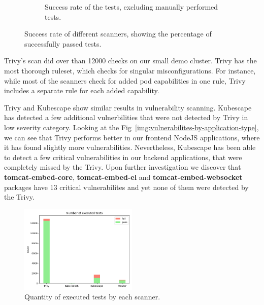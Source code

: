\begin{figure}[!h]
\begin{subfigure}{.4\textwidth}
        \caption{Success rate of the tests, excluding manually performed tests.}
        \label{img:success-rate-no-manual}
        \end{subfigure}
        \caption{Success rate of different scanners, showing the percentage of successfully passed tests.}
        \label{fig:success-rates}
\end{figure}

Trivy's scan did over than 12000 checks on our small demo cluster. Trivy has the most thorough ruleset, which checks for singular misconfigurations. For instance, while most of the scanners check for added pod capabilities in one rule, Trivy includes a separate rule for each added capability.

Trivy and Kubescape show similar results in vulnerability scanning. Kubescape has detected a few additional vulnerbilities that were not detected by Trivy in low severity category. Looking at the Fig~\ref{img:vulnerabilites-by-application-type}, we can see that Trivy performs better in our frontend NodeJS applications, where it has found slightly more vulnerabilities. Nevertheless, Kubescape has been able to detect a few critical vulnerabilities in our backend applications, that were completely missed by the Trivy. Upon further investigation we discover that \textbf{tomcat-embed-core}, \textbf{tomcat-embed-el} and \textbf{tomcat-embed-websocket} packages have 13 critical vulnerabilites and yet none of them were detected by the Trivy. 

\begin{figure}[!hbt]
	\begin{center}
		\includegraphics[width=0.5\textwidth]{images/number-of-checks.png}
        \caption{Quantity of executed tests by each scanner.}
		\label{img:number-of-checks}
	\end{center}
\end{figure}

